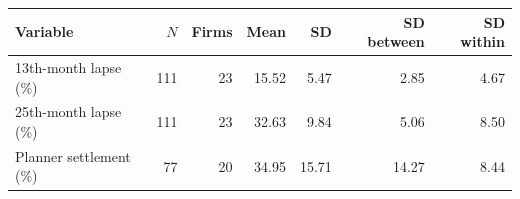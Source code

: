 \begin{tabular}{lrrrrrr}
\toprule
Variable & $N$ & Firms & Mean & SD & SD between & SD within \\
\midrule
13th-month lapse (\%) & 111 & 23 & 15.52 & 5.47 & 2.85 & 4.67 \\
25th-month lapse (\%) & 111 & 23 & 32.63 & 9.84 & 5.06 & 8.50 \\
Planner settlement (\%) & 77 & 20 & 34.95 & 15.71 & 14.27 & 8.44 \\
\bottomrule
\end{tabular}